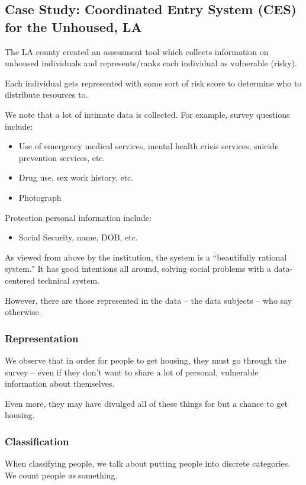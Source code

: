 \documentclass[openany]{book}
\begin{document}
\subsection{Case Study: Coordinated Entry System (CES) for the Unhoused, LA}
The LA county created an assessment tool which collects information on unhoused individuals and represents/ranks each individual as vulnerable (risky).

Each individual gets represented with some sort of risk score to determine who to distribute resources to.

We note that a lot of intimate data is collected. For example, survey questions include:
\begin{itemize}
	\item Use of emergency medical services, mental health crisis services, suicide prevention services, etc.
	\item Drug use, sex work history, etc.
	\item Photograph
\end{itemize}

Protection personal information include:
\begin{itemize}
	\item Social Security, name, DOB, etc.
\end{itemize}

As viewed from above by the institution, the system is a ``beautifully rational system." It has good intentions all around, solving social problems with a data-centered technical system.

However, there are those represented in the data -- the data subjects -- who say otherwise.

\subsubsection{Representation}
We observe that in order for people to get housing, they must go through the survey -- even if they don't want to share a lot of personal, vulnerable information about themselves.

Even more, they may have divulged all of these things for but a chance to get housing.

\subsubsection{Classification}
When classifying people, we talk about putting people into discrete categories. We count people \textit{as} something.
\end{document}
